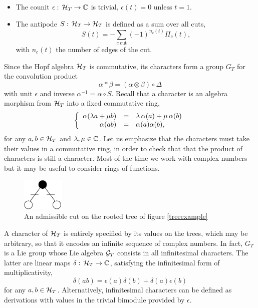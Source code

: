 \documentclass[10pt,here,feynmf]{article}
\begin{document}
\begin{itemize}
\item The counit $\epsilon:\,{\cal H}_{T}\rightarrow{\Bbb C}$ is trivial, $\epsilon(t)=0$ unless $t=1$.

\item
The antipode $S:\,{\cal H}_{T}\rightarrow{\cal H}_{T}$ is defined as a sum over all cuts,
\begin{equation}
S(t)= -\mathop{\sum}\limits_{c\;\mathrm{cut}}
(-1)^{n_{c}(t)}\Pi_{c}(t), \label{antipodetree}
\end{equation}
with $n_{c}(t)$ the number of edges of the cut.
\end{itemize}
Since the Hopf algebra ${\cal H}_{T}$ is commutative, its characters form a  group $G_{T}$ for
the convolution product
\begin{equation}
\alpha\ast\beta=(\alpha\otimes\beta)\circ\Delta
\end{equation}
with unit $\epsilon$ and inverse $\alpha^{-1}=\alpha\circ S$. Recall that a character is an algebra morphism from ${\cal H}_{T}$ into a fixed commutative ring,
\begin{equation}
\left\{
\begin{array}{rcl}
\alpha(\lambda a+\mu b)&=&\lambda\,\alpha(a)+\mu\,\alpha(b)\cr
\alpha(ab)&=&\alpha(a)\alpha(b),
\end{array}
\right.
\end{equation}
for any $a,b\in{\cal H}_{T}$ and $\lambda,\mu\in{\Bbb C}$.   Let us emphasize that the characters must take their values in a commutative ring, in order to check that that the product of characters is still a character. Most of the time we work with complex numbers but it may be useful to consider rings of functions.
 
 
\begin{figure}
\begin{center}
\includegraphics[width=2cm]{t3c.pdf}
\caption{An admissible cut on the rooted tree of figure \ref{treeexample}}
\label{treeexamplecut}
\end{center}
\end{figure}


A character of ${\cal H}_{T}$ is entirely specified by its values on the trees, which may be arbitrary, so that it encodes an infinite sequence of complex numbers. In fact, ${G}_{T}$ is a Lie group whose Lie algebra ${\cal G}_{T}$ consists in all infinitesimal characters. The latter are linear maps $\delta:\,{\cal H}_{T}\rightarrow{\Bbb C}$, satisfying the infinitesimal form of multiplicativity, 
\begin{equation}
\delta(ab)=\epsilon(a)\delta(b)+\delta(a)\epsilon(b)
\end{equation}
for any $a,b\in{\cal H}_{T}$. Alternatively, infinitesimal characters can be defined as derivations with values in the trivial bimodule provided by $\epsilon$.
\end{document}
